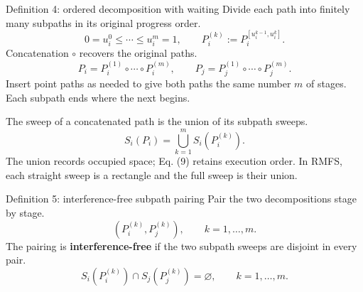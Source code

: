 \begin{frame}{Definition 4: ordered decomposition with waiting}
Divide each path into finitely many subpaths in its original progress order.
\begin{equation}
0=u_i^0\le\cdots\le u_i^m=1,\qquad P_i^{(k)}:=P_i^{[u_i^{k-1},u_i^k]}.
\tag{8}
\end{equation}
Concatenation $\circ$ recovers the original paths.
\begin{equation}
P_i=P_i^{(1)}\circ\cdots\circ P_i^{(m)},\qquad
P_j=P_j^{(1)}\circ\cdots\circ P_j^{(m)}.
\tag{9}
\end{equation}
\small Insert point paths as needed to give both paths the same number $m$ of stages. Each subpath ends where the next begins.
\medskip\par
\normalsize The sweep of a concatenated path is the union of its subpath sweeps.
\begin{equation}S_i(P_i)=\bigcup_{k=1}^{m}S_i(P_i^{(k)}).\tag{10}\end{equation}
\small The union records occupied space; Eq. (9) retains execution order. In RMFS, each straight sweep is a rectangle and the full sweep is their union.
\end{frame}

\begin{frame}{Definition 5: interference-free subpath pairing}
Pair the two decompositions stage by stage.
\begin{equation}
\left(P_i^{(k)},P_j^{(k)}\right),\qquad k=1,\ldots,m.
\tag{11}
\end{equation}
The pairing is \textbf{interference-free} if the two subpath sweeps are disjoint in every pair.
\begin{equation}
S_i(P_i^{(k)})\cap S_j(P_j^{(k)})=\varnothing,\qquad k=1,\ldots,m.
\tag{12}
\end{equation}
\end{frame}

